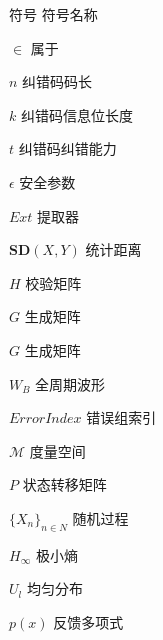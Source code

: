 \begin{symbollist}
\item [符号] \hspace{12em} {符号名称}
\item [$\in$]\hspace{12.5em} {属于}
\item [$n$]\hspace{12.5em} {纠错码码长}
\item [$k$] \hspace{12.5em} {纠错码信息位长度}
\item [$t$] \hspace{12.5em} {纠错码纠错能力}
\item [$\epsilon$] \hspace{12.5em} {安全参数}
\item [$Ext$] \hspace{12.5em} {提取器}
\item [$\mathbf{SD}(X,Y)$] \hspace{10.3em} {统计距离}
\item [$H$] \hspace{12.5em} {校验矩阵}
\item [$G$] \hspace{12.5em} {生成矩阵}
\item [$G$] \hspace{12.5em} {生成矩阵}
\item [$W_B$] \hspace{12.5em} {全周期波形}
\item [$ErrorIndex$] \hspace{9.3em} {错误组索引}
\item [$\mathcal{M}$] \hspace{12.5em} {度量空间}
\item [$P$] \hspace{12.5em} {状态转移矩阵}
\item [$\{X_n\}_{n\in N}$] \hspace{10.7em} {随机过程}
\item [$H_{\infty}$] \hspace{12.5em} {极小熵}
\item [$U_l$] \hspace{12.5em} {均匀分布}
\item [$p(x)$] \hspace{12.5em} {反馈多项式}
\end{symbollist}

